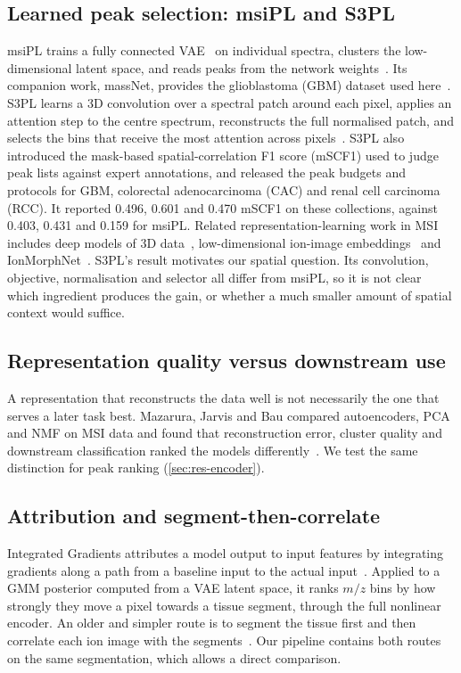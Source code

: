 \subsection{Learned peak selection: msiPL and S3PL}
msiPL trains a fully connected VAE~\citep{kingma2014autoencoding} on
individual spectra, clusters the low-dimensional latent space, and reads peaks
from the network weights~\citep{abdelmoula2021peak}. Its companion work,
massNet, provides the glioblastoma (GBM) dataset used
here~\citep{abdelmoula2022massnet}. S3PL learns a 3D convolution over a
spectral patch around each pixel, applies an attention step to the centre
spectrum, reconstructs the full normalised patch, and selects the bins that
receive the most attention across pixels~\citep{weigand2026spatial}. S3PL also
introduced the mask-based spatial-correlation F1 score (mSCF1) used to judge
peak lists against expert annotations, and released the peak budgets and
protocols for GBM, colorectal adenocarcinoma (CAC) and renal cell carcinoma
(RCC). It reported 0.496, 0.601 and 0.470 mSCF1 on these collections, against
0.403, 0.431 and 0.159 for msiPL. Related representation-learning work in MSI
includes deep models of 3D data~\citep{inglese2017deep}, low-dimensional
ion-image embeddings~\citep{guo2024deepion} and IonMorphNet~\citep{weigand2026ionmorphnet}.
S3PL's result motivates our spatial question. Its convolution, objective,
normalisation and selector all differ from msiPL, so it is not clear which
ingredient produces the gain, or whether a much smaller amount of spatial
context would suffice.

\subsection{Representation quality versus downstream use}
A representation that reconstructs the data well is not necessarily the one
that serves a later task best. Mazarura, Jarvis and Bau compared autoencoders,
PCA and NMF on MSI data and found that reconstruction error, cluster quality
and downstream classification ranked the models
differently~\citep{mazarura2025autoencoder}. We test the same distinction for
peak ranking (\cref{sec:res-encoder}).

\subsection{Attribution and segment-then-correlate}
Integrated Gradients attributes a model output to input features by
integrating gradients along a path from a baseline input to the actual
input~\citep{sundararajan2017axiomatic}. Applied to a GMM posterior computed
from a VAE latent space, it ranks $m/z$ bins by how strongly they move a pixel
towards a tissue segment, through the full nonlinear encoder. An older and
simpler route is to segment the tissue first and then correlate each ion image
with the segments~\citep{alexandrov2010spatial,alexandrov2011efficient}. Our
pipeline contains both routes on the same segmentation, which allows a direct
comparison.

